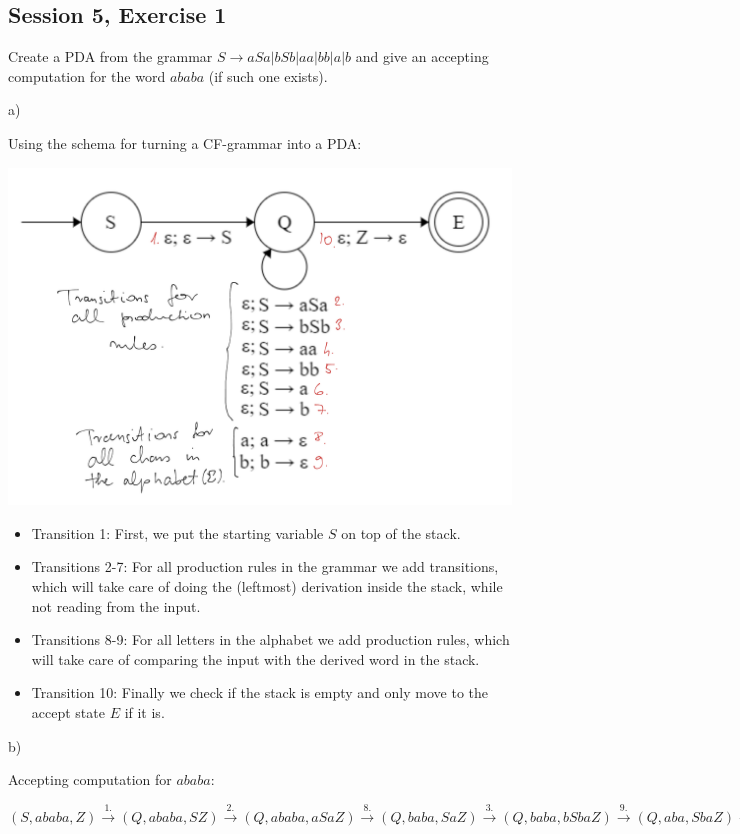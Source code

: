 \subsection {Session 5, Exercise 1}


Create a PDA from the grammar $S \rightarrow aSa|bSb|aa|bb|a|b$ and give an accepting computation for the word $ababa$ (if such one exists).


a)

Using the schema for turning a CF-grammar into a PDA:

\includegraphics[width=\linewidth]{05/6_1.png}

\begin{itemize}
    \item Transition 1: First, we put the starting variable $S$ on top of the stack.
    \item Transitions 2-7: For all production rules in the grammar we add transitions, which will take care of doing the (leftmost) derivation inside the stack, while not reading from the input.
    \item Transitions 8-9: For all letters in the alphabet we add production rules, which will take care of comparing the input with the derived word in the stack.
    \item Transition 10: Finally we check if the stack is empty and only move to the accept state $E$ if it is.
\end{itemize}

b)

Accepting computation for $ababa$:

$(S, ababa, Z)
\xrightarrow{1.} (Q, ababa, SZ)
\xrightarrow{2.} (Q, ababa, aSaZ)
\xrightarrow{8.} (Q, baba, SaZ)
\xrightarrow{3.} (Q, baba, bSbaZ)
\xrightarrow{9.} (Q, aba, SbaZ)
\xrightarrow{6.} (Q, aba, abaZ)
\xrightarrow{8.} (Q, ba, baZ)
\xrightarrow{9.} (Q, a, aZ)
\xrightarrow{8.} (Q, \varepsilon, Z)
\xrightarrow{10.} (E, \varepsilon, \varepsilon)$
